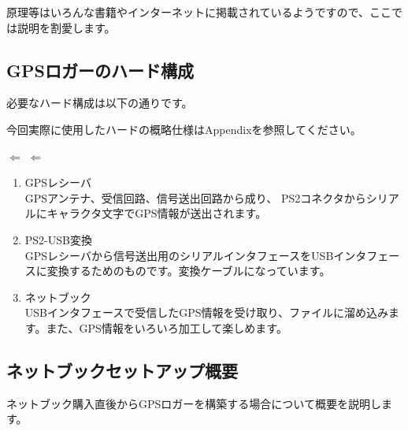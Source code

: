 \documentclass[mingoth,a4paper]{jsarticle}
\begin{document}
原理等はいろんな書籍やインターネットに掲載されているようですので、ここでは説明を割愛します。

\subsection{GPSロガーのハード構成}
必要なハード構成は以下の通りです。

今回実際に使用したハードの概略仕様はAppendixを参照してください。
\begin{center}
        \hspace{1em}$\Longleftarrow$\hspace{1em}
        \hspace{1em}$\Longleftarrow$\hspace{1em}
\end{center}

\begin{enumerate}
 \item GPSレシーバ \\
            GPSアンテナ、受信回路、信号送出回路から成り、 PS2コネクタからシリアルにキャラクタ文字でGPS情報が送出されます。
 \item PS2-USB変換 \\
            GPSレシーバから信号送出用のシリアルインタフェースをUSBインタフェースに変換するためのものです。変換ケーブルになっています。
 \item ネットブック \\
            USBインタフェースで受信したGPS情報を受け取り、ファイルに溜め込みます。また、GPS情報をいろいろ加工して楽しめます。
\end{enumerate}

\subsection{ネットブックセットアップ概要}
ネットブック購入直後からGPSロガーを構築する場合について概要を説明します。
\end{document}
